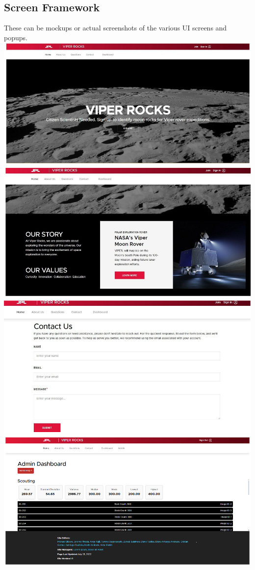 \documentclass{article}
\begin{document}
\subsection{Screen Framework}
These can be mockups or actual screenshots of the various UI screens and popups. \\
\includegraphics{home_page}
\includegraphics{home_page_2}
\includegraphics{contact_us_page}
\includegraphics{admin_dashboard_page}
\end{document}
